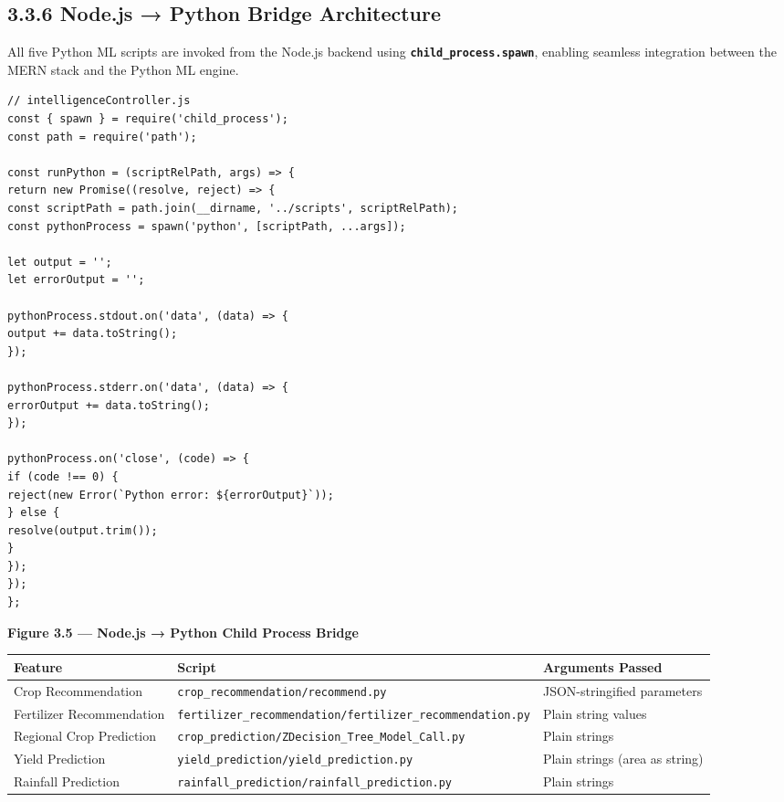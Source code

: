 \documentclass[12pt,a4paper]{report}
\begin{document}
\newpage

\subsection{3.3.6 Node.js → Python Bridge Architecture}

All five Python ML scripts are invoked from the Node.js backend using \textbf{\texttt{child\_process.spawn}}, enabling seamless integration between the MERN stack and the Python ML engine.

\begin{verbatim}
// intelligenceController.js
const { spawn } = require('child_process');
const path = require('path');

const runPython = (scriptRelPath, args) => {
return new Promise((resolve, reject) => {
const scriptPath = path.join(__dirname, '../scripts', scriptRelPath);
const pythonProcess = spawn('python', [scriptPath, ...args]);

let output = '';
let errorOutput = '';

pythonProcess.stdout.on('data', (data) => {
output += data.toString();
});

pythonProcess.stderr.on('data', (data) => {
errorOutput += data.toString();
});

pythonProcess.on('close', (code) => {
if (code !== 0) {
reject(new Error(`Python error: ${errorOutput}`));
} else {
resolve(output.trim());
}
});
});
};
\end{verbatim}

\textbf{Figure 3.5 — Node.js → Python Child Process Bridge}

\begin{table}[h!]
\centering
\begin{tabular}{|l|l|l|}
\hline
Feature & Script & Arguments Passed \\ \hline
Crop Recommendation & \texttt{crop\_recommendation/recommend.py} & JSON-stringified parameters \\ \hline
Fertilizer Recommendation & \texttt{fertilizer\_recommendation/fertilizer\_recommendation.py} & Plain string values \\ \hline
Regional Crop Prediction & \texttt{crop\_prediction/ZDecision\_Tree\_Model\_Call.py} & Plain strings \\ \hline
Yield Prediction & \texttt{yield\_prediction/yield\_prediction.py} & Plain strings (area as string) \\ \hline
Rainfall Prediction & \texttt{rainfall\_prediction/rainfall\_prediction.py} & Plain strings \\ \hline
\end{tabular}
\end{table}
\end{document}
